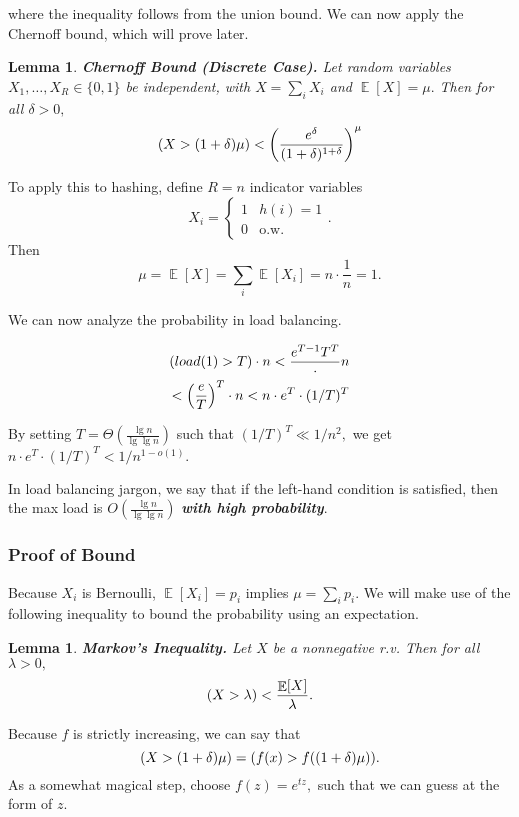 \documentclass[11pt]{article}
\DeclareMathOperator*{\E}{\mathbb{E}}
\let\Pr\relax
\DeclareMathOperator*{\Pr}{\mathbb{P}}
\newtheorem{lemma}[theorem]{Lemma}
\begin{document}
where the inequality follows from the union bound. We can now apply the Chernoff bound, which will prove later.

\begin{lemma}
\textbf{Chernoff Bound (Discrete Case).} Let random variables $X_1, \dots, X_R \in \{0, 1\}$ be independent, with $X = \sum_i X_i$ and $\E[X] = \mu.$ Then for all $\delta > 0,$ $$\Pr(X > (1 + \delta) \mu) < \left(\frac{e^\delta}{(1 + \delta)^{1 + \delta}}\right)^\mu$$
\end{lemma}

To apply this to hashing, define $R = n$ indicator variables $$X_i = \begin{cases} 1 & h(i) = 1 \\ 0 & \text{o.w.} \end{cases}.$$ Then $$\mu = \E[X] = \sum_i \E[X_i] = n \cdot \frac{1}{n} = 1.$$

We can now analyze the probability in load balancing.

\begin{align*}
\Pr(load(1) > T) \cdot n < \frac{e^{T-1}{T^T}} \cdot n \\
< \left(\frac{e}{T}\right)^T \cdot n < n \cdot e^T \cdot (1/T)^T
\end{align*}

By setting $T = \Theta\left(\frac{\lg n}{\lg \lg n}\right)$ such that $(1/T)^T \ll 1/n^2,$ we get $n \cdot e^T \cdot (1/T)^T < 1/n^{1 - o(1)}.$

In load balancing jargon, we say that if the left-hand condition is satisfied, then the max load is $O\left(\frac{\lg n}{\lg \lg n}\right)$ \emph{\textbf{with high probability}}.

\subsubsection{Proof of Bound}

Because $X_i$ is Bernoulli, $\E[X_i] = p_i$ implies $\mu = \sum_i p_i.$ We will make use of the following inequality to bound the probability using an expectation.

\begin{lemma}
\textbf{Markov's Inequality.} Let $X$ be a nonnegative r.v. Then for all $\lambda > 0,$ $$\Pr(X > \lambda) < \frac{\E[X]}{\lambda}.$$
\end{lemma}

Because $f$ is strictly increasing, we can say that $$\Pr(X > (1 + \delta) \mu) = \Pr(f(x) > f((1 + \delta)\mu)).$$ As a somewhat magical step, choose $f(z) = e^{tz},$ such that we can guess at the form of $z.$
\end{document}
